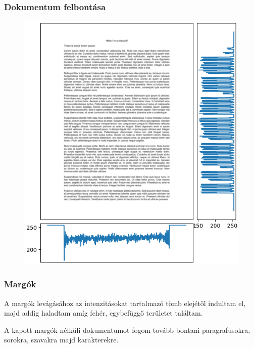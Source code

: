 \documentclass{beamer}
\begin{document}
\begin{frame}[fragile]
\frametitle{Dokumentum felbontása}

\begin{figure}[!tbp]
  \centering
  \begin{minipage}[b]{0.6\textwidth}
    \includegraphics[width=\textwidth]{images/intensity.png}
  \end{minipage}
\end{figure}

\end{frame}

\begin{frame}[fragile]
\frametitle{Margók}

A margók levágásához az intenzitásokat tartalmazó tömb elejétől indultam el, majd addig haladtam amíg fehér, egybefüggő területet találtam. 

\bigskip

A kapott margók nélküli dokumentumot fogom tovább bontani paragrafusokra, sorokra, szavakra majd karakterekre.

\end{frame}
\end{document}
